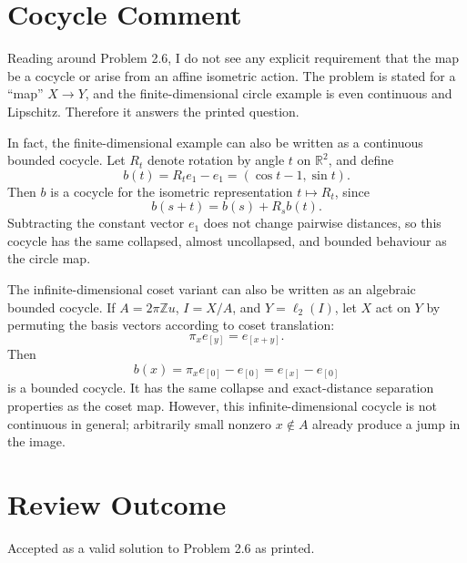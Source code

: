 \documentclass[11pt]{article}
\begin{document}
\section*{Cocycle Comment}

Reading around Problem 2.6, I do not see any explicit requirement that the map be a cocycle or arise from an affine isometric action. The problem is stated for a ``map'' \(X\to Y\), and the finite-dimensional circle example is even continuous and Lipschitz. Therefore it answers the printed question.

In fact, the finite-dimensional example can also be written as a continuous bounded cocycle. Let \(R_t\) denote rotation by angle \(t\) on \(\mathbb R^2\), and define
\[
b(t)=R_t e_1-e_1=(\cos t-1,\sin t).
\]
Then \(b\) is a cocycle for the isometric representation \(t\mapsto R_t\), since
\[
b(s+t)=b(s)+R_s b(t).
\]
Subtracting the constant vector \(e_1\) does not change pairwise distances, so this cocycle has the same collapsed, almost uncollapsed, and bounded behaviour as the circle map.

The infinite-dimensional coset variant can also be written as an algebraic bounded cocycle. If \(A=2\pi\mathbb Z u\), \(I=X/A\), and \(Y=\ell_2(I)\), let \(X\) act on \(Y\) by permuting the basis vectors according to coset translation:
\[
\pi_x e_{[y]}=e_{[x+y]}.
\]
Then
\[
b(x)=\pi_x e_{[0]}-e_{[0]}=e_{[x]}-e_{[0]}
\]
is a bounded cocycle. It has the same collapse and exact-distance separation properties as the coset map. However, this infinite-dimensional cocycle is not continuous in general; arbitrarily small nonzero \(x\notin A\) already produce a jump in the image.

\section*{Review Outcome}

Accepted as a valid solution to Problem 2.6 as printed.
\end{document}
